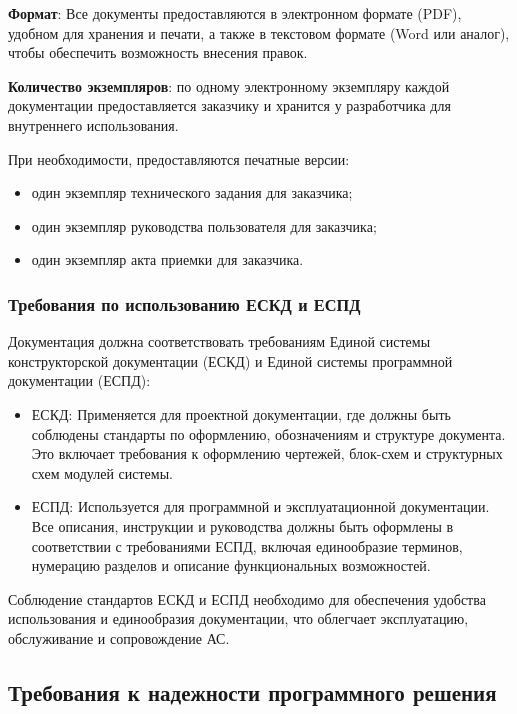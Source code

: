 \textbf{Формат}: Все документы предоставляются в электронном формате (PDF),
удобном для хранения и печати, а также в текстовом формате (Word или аналог),
чтобы обеспечить возможность внесения правок.

\textbf{Количество экземпляров}:
по одному электронному экземпляру каждой документации предоставляется заказчику
и хранится у разработчика для внутреннего использования.

При необходимости, предоставляются печатные версии:

\begin{itemize}
	\item один экземпляр технического задания для заказчика;
	\item один экземпляр руководства пользователя для заказчика;
	\item один экземпляр акта приемки для заказчика.
\end{itemize}

\subsubsection{Требования по использованию ЕСКД и ЕСПД}

Документация должна соответствовать требованиям
Единой системы конструкторской документации (ЕСКД)
и Единой системы программной документации (ЕСПД):

\begin{itemize}
	\item ЕСКД: Применяется для проектной документации,
		где должны быть соблюдены стандарты по оформлению, обозначениям
		и структуре документа.
		Это включает требования к оформлению чертежей,
		блок-схем и структурных схем модулей системы.
	\item ЕСПД: Используется для программной и эксплуатационной документации.
		Все описания, инструкции и руководства должны быть оформлены
		в соответствии с требованиями ЕСПД, включая единообразие терминов,
		нумерацию разделов и описание функциональных возможностей.
\end{itemize}

Соблюдение стандартов ЕСКД и ЕСПД необходимо
для обеспечения удобства использования и единообразия документации,
что облегчает эксплуатацию, обслуживание и сопровождение АС.

\subsection{Требования к надежности программного решения}

